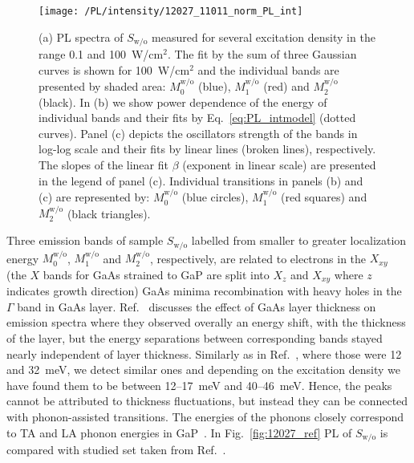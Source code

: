 \begin{figure}
	\centering
	\texttt{[image: /PL/intensity/12027\_11011\_norm\_PL\_int]}
	\caption{(a) PL spectra of $S_\mathrm{w/o}$ measured for several excitation density in the range 0.1 and 100~W/cm$^2$. The fit by the sum of three Gaussian curves is shown for 100~W/cm$^2$ and the individual bands are presented by shaded area: $M_0^\mathrm{w/o}$ (blue), $M_1^\mathrm{w/o}$ (red) and $M_2^\mathrm{w/o}$ (black). In (b) we show power dependence of the energy of individual bands and their fits by Eq.~\ref{eq:PL_intmodel} (dotted curves). Panel (c) depicts the oscillators strength of the bands in log-log scale and their fits by linear lines (broken lines), respectively. The slopes of the linear fit $\beta$ (exponent in linear scale) are presented in the legend of panel (c). Individual transitions in panels (b) and (c) are represented by: $M_0^\mathrm{w/o}$ (blue circles), $M_1^\mathrm{w/o}$ (red squares) and $M_2^\mathrm{w/o}$ (black triangles).}
	\label{fig:QD_wo_int}
\end{figure}
Three emission bands of sample $S_\mathrm{w/o}$ labelled from smaller to greater localization energy $M_0^\mathrm{w/o}$, $M_1^\mathrm{w/o}$ and $M_2^\mathrm{w/o}$, respectively, are related to electrons in the $X_{xy}$ (the $X$ bands for GaAs strained to GaP are split into $X_z$ and $X_{xy}$ where $z$ indicates growth direction) GaAs minima recombination with heavy holes in the $\Gamma$ band in GaAs layer. Ref.~\citep{Prieto_APL1997} discusses the effect of GaAs layer thickness on emission spectra where they observed overally an energy shift, with the thickness of the layer, but the energy separations between corresponding bands stayed nearly independent of layer thickness. Similarly as in Ref.~\citep{Prieto_APL1997}, where those were 12 and 32~meV, we detect similar ones and depending on the excitation density we have found them to be between 12--17~meV and 40--46~meV. Hence, the peaks cannot be attributed to thickness fluctuations, but instead they can be connected with phonon-assisted transitions. The energies of the phonons closely correspond to TA and LA phonon energies in GaP~\citep{Prieto_APL1997}. In Fig.~\ref{fig:12027_ref} PL of $S_\mathrm{w/o}$ is compared with studied set taken from Ref.~\citep{Prieto_APL1997}.



